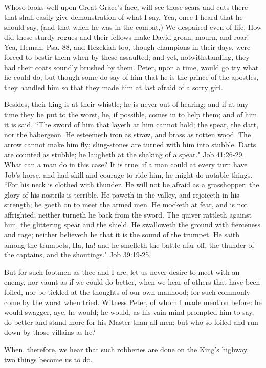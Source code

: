 Whoso looks well upon Great-Grace's face, will see those scars and cuts there that shall easily give demonstration of what I say. Yea, once I heard that he should say, (and that when he was in the combat,) We despaired even of life. How did these sturdy rogues and their fellows make David groan, mourn, and roar! Yea, Heman, Psa. 88, and Hezekiah too, though champions in their days, were forced to bestir them when by these assaulted; and yet, notwithstanding, they had their coats soundly brushed by them. Peter, upon a time, would go try what he could do; but though some do say of him that he is the prince of the apostles, they handled him so that they made him at last afraid of a sorry girl.

Besides, their king is at their whistle; he is never out of hearing; and if at any time they be put to the worst, he, if possible, comes in to help them; and of him it is said, ``The sword of him that layeth at him cannot hold; the spear, the dart, nor the habergeon. He esteemeth iron as straw, and brass as rotten wood. The arrow cannot make him fly; sling-stones are turned with him into stubble. Darts are counted as stubble; he laugheth at the shaking of a spear." Job 41:26-29. What can a man do in this case? It is true, if a man could at every turn have Job's horse, and had skill and courage to ride him, he might do notable things. ``For his neck is clothed with thunder. He will not be afraid as a grasshopper: the glory of his nostrils is terrible. He paweth in the valley, and rejoiceth in his strength; he goeth on to meet the armed men. He mocketh at fear, and is not affrighted; neither turneth he back from the sword. The quiver rattleth against him, the glittering spear and the shield. He swalloweth the ground with fierceness and rage; neither believeth he that it is the sound of the trumpet. He saith among the trumpets, Ha, ha! and he smelleth the battle afar off, the thunder of the captains, and the shoutings." Job 39:19-25.

But for such footmen as thee and I are, let us never desire to meet with an enemy, nor vaunt as if we could do better, when we hear of others that have been foiled, nor be tickled at the thoughts of our own manhood; for such commonly come by the worst when tried. Witness Peter, of whom I made mention before: he would swagger, aye, he would; he would, as his vain mind prompted him to say, do better and stand more for his Master than all men: but who so foiled and run down by those villains as he?

When, therefore, we hear that such robberies are done on the King's highway, two things become us to do.

